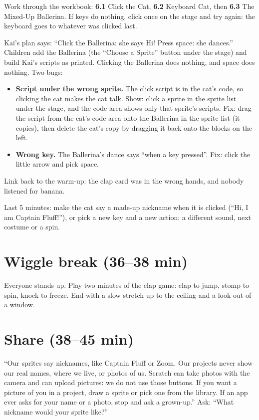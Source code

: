 Work through the workbook: \textbf{6.1} Click the Cat, \textbf{6.2} Keyboard Cat, then \textbf{6.3} The Mixed-Up Ballerina. If keys do nothing, click once on the stage and try again: the keyboard goes to whatever was clicked last.

\begin{bughunt}
Kai's plan says: \enquote{Click the Ballerina: she says Hi! Press space: she dances.} Children add the Ballerina (the \enquote{Choose a Sprite} button under the stage) and build Kai's scripts as printed. Clicking the Ballerina does nothing, and space does nothing. Two bugs:
\begin{itemize}[leftmargin=1.2em,itemsep=1pt]
  \item \textbf{Script under the wrong sprite.} The click script is in the cat's code, so clicking the cat makes the cat talk. Show: click a sprite in the sprite list under the stage, and the code area shows only that sprite's scripts. Fix: drag the script from the cat's code area onto the Ballerina in the sprite list (it copies), then delete the cat's copy by dragging it back onto the blocks on the left.
  \item \textbf{Wrong key.} The Ballerina's dance says \enquote{when a key pressed}. Fix: click the little arrow and pick space.
\end{itemize}
Link back to the warm-up: the clap card was in the wrong hands, and nobody listened for banana.
\end{bughunt}

\begin{freebuild}
Last 5 minutes: make the cat say a made-up nickname when it is clicked (\enquote{Hi, I am Captain Fluff!}), or pick a new key and a new action: a different sound, next costume or a spin.
\end{freebuild}

\section{Wiggle break (36--38 min)}
Everyone stands up. Play two minutes of the clap game: clap to jump, stomp to spin, knock to freeze. End with a slow stretch up to the ceiling and a look out of a window.

\section{Share (38--45 min)}
\begin{safety}
\enquote{Our sprites say nicknames, like Captain Fluff or Zoom. Our projects never show our real names, where we live, or photos of us. Scratch can take photos with the camera and can upload pictures: we do not use those buttons. If you want a picture of you in a project, draw a sprite or pick one from the library. If an app ever asks for your name or a photo, stop and ask a grown-up.} Ask: \enquote{What nickname would your sprite like?}
\end{safety}

